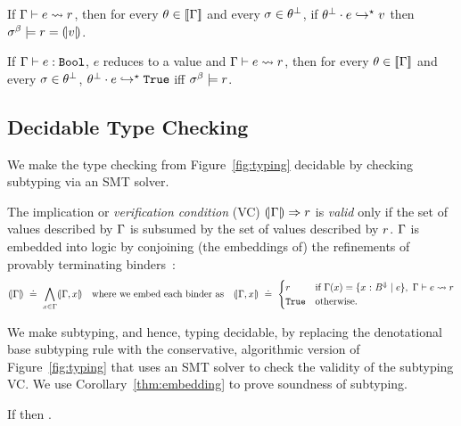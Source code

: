 \begin{theorem}\label{thm:embedding-general}
If ${ \Gamma\vdash e \rightsquigarrow r }$,
then for every ${\theta\in[\![\Gamma]\!]}$
and every ${\sigma\in {\ensuremath{\theta}^\perp}}$,
if ${{\theta^\perp} \cdot {\ensuremath{e}} }\hookrightarrow^{\star}{v}$
then $\sigma^\beta \models r = (\!|v|\!)$.
\end{theorem}


\begin{corollary}\label{thm:embedding}
If ${\Gamma \vdash e : \mathtt{Bool}}$, $e$ reduces to a value and
${ \Gamma\vdash e \rightsquigarrow r }$,
then for every ${\theta\in[\![\Gamma]\!]}$
and every ${\sigma\in {\ensuremath{\theta}^\perp}}$,
${{\theta^\perp} \cdot {\ensuremath{e}} }\hookrightarrow^{\star}{\mathtt{True}}$ iff
$\sigma^\beta \models r$.
\end{corollary}

\subsection{Decidable Type Checking}

We make the type checking from Figure~\ref{fig:typing} decidable
by checking subtyping via an SMT solver.

%
The implication or \emph{verification condition} (VC)
${(\!|\Gamma|\!) \Rightarrow r}$ is \emph{valid} only if the
set of values described by $\Gamma$ is subsumed by
the set of values described by $r$.
%
$\Gamma$ is embedded into logic by conjoining
(the embeddings of) the refinements of
provably terminating binders~\cite{Vazou14}:
%
$$
\embed{\env} \defeq \bigwedge_{x \in \env} \embed{\env, x} %
\quad \mbox{where we embed each binder as} \quad
\embed{\env, x} \defeq \begin{cases}
                           \pred  & \text{if } \env(x)=\tref{x}{\btyp^{\tlabel}}{e},\
                                    \tologicshort{\env}{e}{\btyp}{\pred}{\embed{\btyp}}{\smtenv}{\axioms} \\
                           \etrue & \text{otherwise}.
                         \end{cases}
$$
%

%
We make subtyping, and hence, typing decidable,
by replacing the denotational base subtyping
rule \rsubbasecore with the conservative,
algorithmic version \rsubbasesmt of Figure~\ref{fig:typing} that uses an SMT
solver to check the validity of the subtyping VC.
%
We use Corollary~\ref{thm:embedding} to prove
soundness of subtyping.
%
\begin{lemma}\label{lem:subtyping} %
If {}
then {\issubtype{\env}{\tref{v}{\btyp}{e_1}}{\tref{v}{\btyp}{e_2}}}.
\end{lemma}

